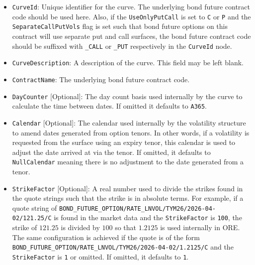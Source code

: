 \begin{itemize}

\item \lstinline!CurveId!:
  Unique identifier for the curve. The underlying bond future contract code should be used here.
  Also, if the \lstinline!UseOnlyPutCall! is set to \lstinline!C! or \lstinline!P! and the 
  \lstinline!SeparateCallPutVols! flag is set such that bond future options on this contract will use separate put and 
  call surfaces, the bond future contract code should be suffixed with \lstinline!_CALL! or \lstinline!_PUT! 
  respectively in the \lstinline!CurveId! node.
  
\item \lstinline!CurveDescription!:
  A description of the curve. This field may be left blank.
  
\item \lstinline!ContractName!:
  The underlying bond future contract code.
  
\item \lstinline!DayCounter! [Optional]:
  The day count basis used internally by the curve to calculate the time between dates.
  If omitted it defaults to \lstinline!A365!.
  
\item \lstinline!Calendar! [Optional]:
  The calendar used internally by the volatility structure to amend dates generated from option tenors.
  In other words, if a volatility is requested from the surface using an expiry tenor, this calendar is used to adjust 
  the date arrived at via the tenor.
  If omitted, it defaults to \lstinline!NullCalendar! meaning there is no adjustment to the date generated from a tenor.
  
\item \lstinline!StrikeFactor! [Optional]:
  A real number used to divide the strikes found in the quote strings such that the strike is in absolute terms.
  For example, if a quote string of \lstinline!BOND_FUTURE_OPTION/RATE_LNVOL/TYM26/2026-04-02/121.25/C! is found in 
  the market data and the \lstinline!StrikeFactor! is \lstinline!100!, the strike of $121.25$ is divided by $100$ so 
  that $1.2125$ is used internally in ORE. The same configuration is achieved if the quote is of the form 
  \lstinline!BOND_FUTURE_OPTION/RATE_LNVOL/TYM26/2026-04-02/1.2125/C! and the \lstinline!StrikeFactor! is 
  \lstinline!1! or omitted.
  If omitted, it defaults to \lstinline!1!.
  

\end{itemize}
